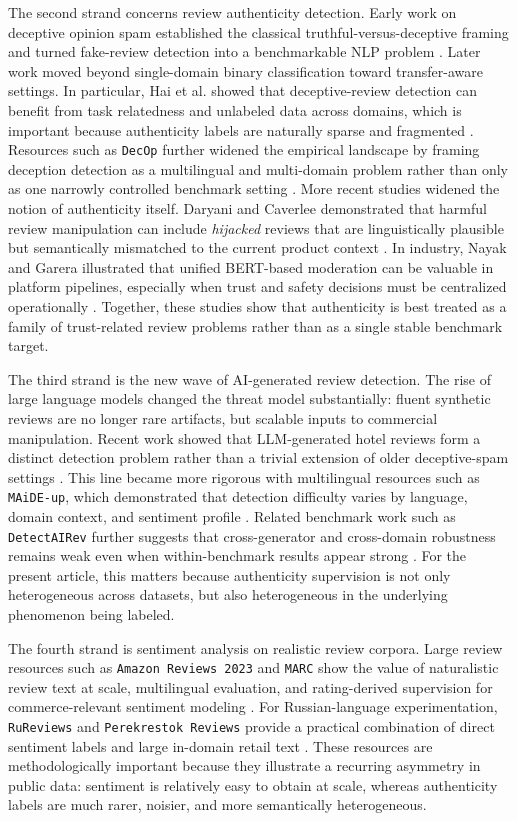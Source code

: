 \documentclass[12pt,a4paper]{article}
\begin{document}
The second strand concerns review authenticity detection. Early work on deceptive opinion spam established the classical truthful-versus-deceptive framing and turned fake-review detection into a benchmarkable NLP problem \cite{ott2011}. Later work moved beyond single-domain binary classification toward transfer-aware settings. In particular, Hai et al. showed that deceptive-review detection can benefit from task relatedness and unlabeled data across domains, which is important because authenticity labels are naturally sparse and fragmented \cite{hai2016}. Resources such as \texttt{DecOp} further widened the empirical landscape by framing deception detection as a multilingual and multi-domain problem rather than only as one narrowly controlled benchmark setting \cite{capuozzo2020}. More recent studies widened the notion of authenticity itself. Daryani and Caverlee demonstrated that harmful review manipulation can include \emph{hijacked} reviews that are linguistically plausible but semantically mismatched to the current product context \cite{daryani2021}. In industry, Nayak and Garera illustrated that unified BERT-based moderation can be valuable in platform pipelines, especially when trust and safety decisions must be centralized operationally \cite{nayak2022}. Together, these studies show that authenticity is best treated as a family of trust-related review problems rather than as a single stable benchmark target.

The third strand is the new wave of AI-generated review detection. The rise of large language models changed the threat model substantially: fluent synthetic reviews are no longer rare artifacts, but scalable inputs to commercial manipulation. Recent work showed that LLM-generated hotel reviews form a distinct detection problem rather than a trivial extension of older deceptive-spam settings \cite{liyanage2024}. This line became more rigorous with multilingual resources such as \texttt{MAiDE-up}, which demonstrated that detection difficulty varies by language, domain context, and sentiment profile \cite{ignat2025}. Related benchmark work such as \texttt{DetectAIRev} further suggests that cross-generator and cross-domain robustness remains weak even when within-benchmark results appear strong \cite{agrahari2025}. For the present article, this matters because authenticity supervision is not only heterogeneous across datasets, but also heterogeneous in the underlying phenomenon being labeled.

The fourth strand is sentiment analysis on realistic review corpora. Large review resources such as \texttt{Amazon Reviews 2023} and \texttt{MARC} show the value of naturalistic review text at scale, multilingual evaluation, and rating-derived supervision for commerce-relevant sentiment modeling \cite{hou2023,keung2020}. For Russian-language experimentation, \texttt{RuReviews} and \texttt{Perekrestok Reviews} provide a practical combination of direct sentiment labels and large in-domain retail text \cite{sismetanin,perekrestok}. These resources are methodologically important because they illustrate a recurring asymmetry in public data: sentiment is relatively easy to obtain at scale, whereas authenticity labels are much rarer, noisier, and more semantically heterogeneous.
\end{document}
